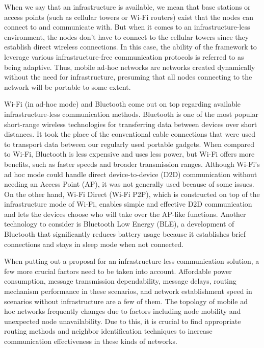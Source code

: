 \documentclass[12pt, conference, onecolumn, a4paper]{IEEEtran}
\begin{document}
When we say that an infrastructure is available, we mean that base stations or
access points (such as cellular towers or Wi-Fi routers) exist that the nodes
can connect to and communicate with. But when it comes to an
infrastructure-less environment, the nodes don’t have to connect to the
cellular towers since they establish direct wireless connections. In this case,
the ability of the framework to leverage various infrastructure-free
communication protocols is referred to as being adaptive. Thus, mobile ad-hoc
networks are networks created dynamically without the need for infrastructure,
presuming that all nodes connecting to the network will be portable to some
extent.

Wi-Fi (in ad-hoc mode) and Bluetooth come out on top regarding available
infrastructure-less communication methods. Bluetooth is one of the most popular
short-range wireless technologies for transferring data between devices over
short distances. It took the place of the conventional cable connections that
were used to transport data between our regularly used portable gadgets. When
compared to Wi-Fi, Bluetooth is less expensive and uses less power, but Wi-Fi
offers more benefits, such as faster speeds and broader transmission ranges.
Although Wi-Fi's ad hoc mode could handle direct device-to-device (D2D)
communication without needing an Access Point (AP), it was not generally used
because of some issues. On the other hand, Wi-Fi Direct (Wi-Fi P2P), which is
constructed on top of the infrastructure mode of Wi-Fi, enables simple and
effective D2D communication and lets the devices choose who will take over the
AP-like functions. Another technology to consider is Bluetooth Low Energy
(BLE), a development of Bluetooth that significantly reduces battery usage
because it establishes brief connections and stays in sleep mode when not
connected.

When putting out a proposal for an infrastructure-less communication solution,
a few more crucial factors need to be taken into account. Affordable power
consumption, message transmission dependability, message delays, routing
mechanism performance in these scenarios, and network establishment speed in
scenarios without infrastructure are a few of them. The topology of mobile ad
hoc networks frequently changes due to factors including node mobility and
unexpected node unavailability.
Due to this, it is crucial to find appropriate routing methods and neighbor
identification techniques to increase communication effectiveness in these
kinds of networks.
\end{document}
